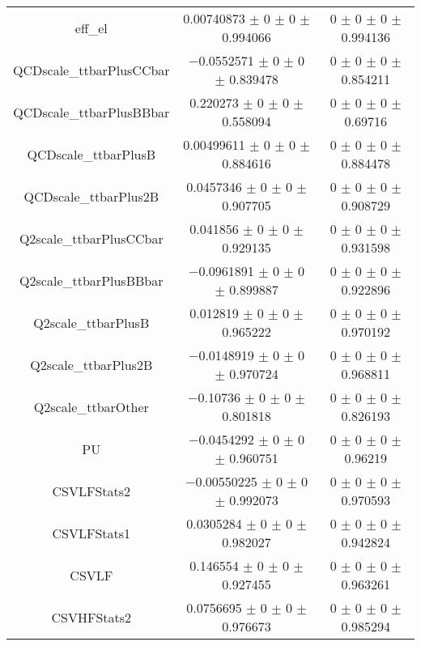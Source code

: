 \begin{table}
\begin{tabular}{ccc}
eff\_el & \num{0.00740873} $\pm$ \num{0} $\pm$ \num{0} $\pm$ \num{0.994066} & \num{0} $\pm$ \num{0} $\pm$ \num{0} $\pm$ \num{0.994136}\\
QCDscale\_ttbarPlusCCbar & \num{-0.0552571} $\pm$ \num{0} $\pm$ \num{0} $\pm$ \num{0.839478} & \num{0} $\pm$ \num{0} $\pm$ \num{0} $\pm$ \num{0.854211}\\
QCDscale\_ttbarPlusBBbar & \num{0.220273} $\pm$ \num{0} $\pm$ \num{0} $\pm$ \num{0.558094} & \num{0} $\pm$ \num{0} $\pm$ \num{0} $\pm$ \num{0.69716}\\
QCDscale\_ttbarPlusB & \num{0.00499611} $\pm$ \num{0} $\pm$ \num{0} $\pm$ \num{0.884616} & \num{0} $\pm$ \num{0} $\pm$ \num{0} $\pm$ \num{0.884478}\\
QCDscale\_ttbarPlus2B & \num{0.0457346} $\pm$ \num{0} $\pm$ \num{0} $\pm$ \num{0.907705} & \num{0} $\pm$ \num{0} $\pm$ \num{0} $\pm$ \num{0.908729}\\
Q2scale\_ttbarPlusCCbar & \num{0.041856} $\pm$ \num{0} $\pm$ \num{0} $\pm$ \num{0.929135} & \num{0} $\pm$ \num{0} $\pm$ \num{0} $\pm$ \num{0.931598}\\
Q2scale\_ttbarPlusBBbar & \num{-0.0961891} $\pm$ \num{0} $\pm$ \num{0} $\pm$ \num{0.899887} & \num{0} $\pm$ \num{0} $\pm$ \num{0} $\pm$ \num{0.922896}\\
Q2scale\_ttbarPlusB & \num{0.012819} $\pm$ \num{0} $\pm$ \num{0} $\pm$ \num{0.965222} & \num{0} $\pm$ \num{0} $\pm$ \num{0} $\pm$ \num{0.970192}\\
Q2scale\_ttbarPlus2B & \num{-0.0148919} $\pm$ \num{0} $\pm$ \num{0} $\pm$ \num{0.970724} & \num{0} $\pm$ \num{0} $\pm$ \num{0} $\pm$ \num{0.968811}\\
Q2scale\_ttbarOther & \num{-0.10736} $\pm$ \num{0} $\pm$ \num{0} $\pm$ \num{0.801818} & \num{0} $\pm$ \num{0} $\pm$ \num{0} $\pm$ \num{0.826193}\\
PU & \num{-0.0454292} $\pm$ \num{0} $\pm$ \num{0} $\pm$ \num{0.960751} & \num{0} $\pm$ \num{0} $\pm$ \num{0} $\pm$ \num{0.96219}\\
CSVLFStats2 & \num{-0.00550225} $\pm$ \num{0} $\pm$ \num{0} $\pm$ \num{0.992073} & \num{0} $\pm$ \num{0} $\pm$ \num{0} $\pm$ \num{0.970593}\\
CSVLFStats1 & \num{0.0305284} $\pm$ \num{0} $\pm$ \num{0} $\pm$ \num{0.982027} & \num{0} $\pm$ \num{0} $\pm$ \num{0} $\pm$ \num{0.942824}\\
CSVLF & \num{0.146554} $\pm$ \num{0} $\pm$ \num{0} $\pm$ \num{0.927455} & \num{0} $\pm$ \num{0} $\pm$ \num{0} $\pm$ \num{0.963261}\\
CSVHFStats2 & \num{0.0756695} $\pm$ \num{0} $\pm$ \num{0} $\pm$ \num{0.976673} & \num{0} $\pm$ \num{0} $\pm$ \num{0} $\pm$ \num{0.985294}\\

\end{tabular}
\end{table}
